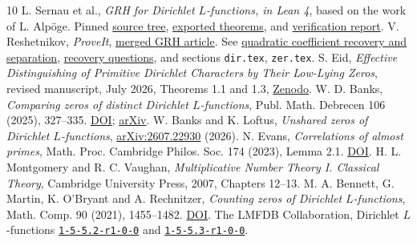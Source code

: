 \documentclass[11pt]{article}
\begin{document}
\begin{thebibliography}{10}\small
{} L. Sernau et al., \emph{GRH for Dirichlet $L$-functions, in Lean 4}, based on the work of L. Alp\"oge. Pinned \href{https://github.com/lsernau/grh-lean/tree/72fead102f663d5c7a407964a13dc0cf9d977207}{source tree}, \href{https://github.com/lsernau/grh-lean/blob/72fead102f663d5c7a407964a13dc0cf9d977207/grh/src/Main.lean}{exported theorems}, and \href{https://github.com/lsernau/grh-lean/blob/72fead102f663d5c7a407964a13dc0cf9d977207/grh/README.md}{verification report}.
 V. Reshetnikov, \emph{ProveIt}, \href{https://github.com/VladimirReshetnikov/ProveIt/tree/f6b9918d87befd09f8786df70e668452171abb89/Analysis/GeneralizedRiemannHypothesis/Article}{merged GRH article}. See \href{https://github.com/VladimirReshetnikov/ProveIt/blob/f6b9918d87befd09f8786df70e668452171abb89/Analysis/GeneralizedRiemannHypothesis/Article/sections/rec.tex\#L2319-L2375}{quadratic coefficient recovery and separation}, \href{https://github.com/VladimirReshetnikov/ProveIt/blob/f6b9918d87befd09f8786df70e668452171abb89/Analysis/GeneralizedRiemannHypothesis/Article/sections/rec.tex\#L2617}{recovery questions}, and sections \texttt{dir.tex}, \texttt{zer.tex}.
 S. Eid, \emph{Effective Distinguishing of Primitive Dirichlet Characters by Their Low-Lying Zeros}, revised manuscript, July 2026, Theorems 1.1 and 1.3, \href{https://doi.org/10.5281/zenodo.21326653}{Zenodo}.
 W. D. Banks, \emph{Comparing zeros of distinct Dirichlet $L$-functions}, Publ. Math. Debrecen 106 (2025), 327--335. \href{https://doi.org/10.5486/PMD.2025.9899}{DOI}; \href{https://arxiv.org/abs/2302.07073}{arXiv}.
 W. Banks and K. Loftus, \emph{Unshared zeros of Dirichlet $L$-functions}, \href{https://arxiv.org/abs/2607.22930}{arXiv:2607.22930} (2026).
 N. Evans, \emph{Correlations of almost primes}, Math. Proc. Cambridge Philos. Soc. 174 (2023), Lemma 2.1. \href{https://doi.org/10.1017/S0305004122000251}{DOI}.
 H. L. Montgomery and R. C. Vaughan, \emph{Multiplicative Number Theory I. Classical Theory}, Cambridge University Press, 2007, Chapters 12--13.
 M. A. Bennett, G. Martin, K. O'Bryant and A. Rechnitzer, \emph{Counting zeros of Dirichlet $L$-functions}, Math. Comp. 90 (2021), 1455--1482. \href{https://doi.org/10.1090/mcom/3599}{DOI}.
 The LMFDB Collaboration, Dirichlet $L$-functions \href{https://www.lmfdb.org/L/1/5/5.2/r1/0/0}{\texttt{1-5-5.2-r1-0-0}} and \href{https://www.lmfdb.org/L/1/5/5.3/r1/0/0}{\texttt{1-5-5.3-r1-0-0}}.
\end{thebibliography}
\end{document}
